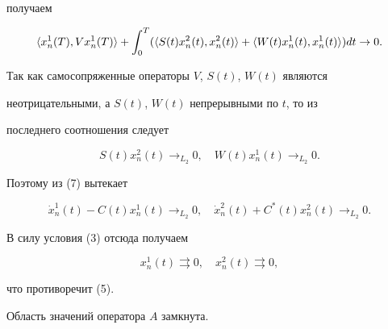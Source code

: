 \begin{pf}
получаем


$$


\la x^{1}_{n}(T),Vx^{1}_{n}(T)\ra+\int_{0}^{T}


(\la S(t)x^{2}_{n}(t),x^{2}_{n}(t)\ra +\la


W(t)x^{1}_{n}(t),x^{1}_{n}(t)\ra)dt\to0.


$$


Так как самосопряженные операторы $V$, $S(t)$, $W(t)$ являются


неотрицательными, а $S(t)$, $W(t)$ непрерывными по $t$, то из


последнего соотношения следует


$$


S(t)x^{2}_{n}(t)\to_{L_{2}}0,\quad W(t)x^{1}_{n}(t)\to_{L_{2}}0.


$$


Поэтому из (7) вытекает


$$


\Dot x^1_n(t)-C(t)x^{1}_{n}(t)\to_{L_{2}}0,\quad


\Dot x^2_n(t)+C^{*}(t)x^{2}_{n}(t)\to_{L_{2}}0.


$$


В силу условия (3) отсюда получаем


$$


x^{1}_{n}(t)\rightrightarrows 0,\quad


x^{2}_{n}(t)\rightrightarrows 0,


$$


что противоречит (5).


\end{pf}





\begin{lem}


Область значений оператора $A$ замкнута.


\end{lem}





